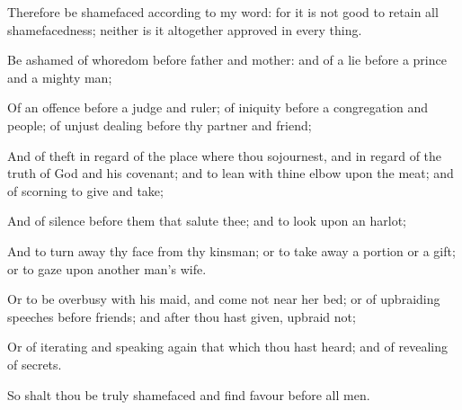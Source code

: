 {\par }{\PP {}Therefore be shamefaced according to my word: for it is not good to retain all shamefacedness; neither is it altogether approved in every thing.
\par }{\PP {}Be ashamed of whoredom before father and mother: and of a lie before a prince and a mighty man;
\par }{\PP {}Of an offence before a judge and ruler; of iniquity before a congregation and people; of unjust dealing before thy partner and friend;
\par }{\PP {}And of theft in regard of the place where thou sojournest, and in regard of the truth of God and his covenant; and to lean with thine elbow upon the meat; and of scorning to give and take;
\par }{\PP {}And of silence before them that salute thee; and to look upon an harlot;
\par }{\PP {}And to turn away thy face from thy kinsman; or to take away a portion or a gift; or to gaze upon another man’s wife.
\par }{\PP {}Or to be overbusy with his maid, and come not near her bed; or of upbraiding speeches before friends; and after thou hast given, upbraid not;
\par }{\PP {}Or of iterating and speaking again that which thou hast heard; and of revealing of secrets.
\par }{\PP {}So shalt thou be truly shamefaced and find favour before all men.

}
